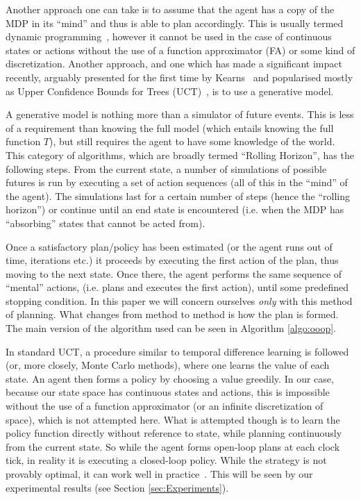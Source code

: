 \documentclass[conference]{IEEEtran}
\begin{document}
Another approach one can take is to assume that the agent has a copy of the MDP in its ``mind'' and thus is able to plan accordingly. This is usually termed dynamic programming~\cite{sutton1998reinforcement}, however it cannot be used in the case of continuous states or actions without the use of a function approximator (FA) or some kind of discretization. Another approach, and one which has made a significant impact recently, arguably presented for the first time by Kearns~\cite{citeulike:1584916} and popularised mostly as Upper Confidence Bounds for Trees (UCT)~\cite{kocsis2006bandit}, is to use a generative model.

A generative model is nothing more than a simulator of future events. This is less of a requirement than knowing the full model (which entails knowing the full function $T$), but still requires the agent to have some knowledge of the world. This category of algorithms, which are broadly termed ``Rolling Horizon'', has the following steps. From the current state, a number of simulations of possible futures is run by executing a set of action sequences (all of this in the ``mind'' of the agent). The simulations last for a certain number of steps (hence the ``rolling horizon'') or continue until an end state is encountered (i.e. when the MDP has ``absorbing'' states that cannot be acted from).

Once a satisfactory plan/policy has been estimated (or the agent runs out of time, iterations etc.) it proceeds by executing the first action of the plan, thus moving to the next state. Once there, the agent performs the same sequence of ``mental'' actions, (i.e. plans and executes the first action), until some predefined stopping condition.  In this paper we will concern ourselves \textit{only} with this method of planning. What changes from method to method is how the plan is formed. The main version of the algorithm used can be seen in Algorithm \ref{algo:ooop}.

In standard UCT, a procedure similar to temporal difference learning is followed (or, more closely, Monte Carlo methods), where one learns the value of each state. An agent then forms a policy by choosing a value greedily. In our case, because our state space has continuous states and actions, this is impossible without the use of a function approximator (or an infinite discretization of space), which is not attempted here. What is attempted though is to learn the policy function directly without reference to state, while planning continuously from the current state. So while the agent forms open-loop plans at each clock tick, in reality it is executing a closed-loop policy. While the strategy is not provably optimal, it can work well in practice~\cite{weinstein2012bandit}. This will be seen by our experimental results (see Section \ref{sec:Experiments}). 
\end{document}
